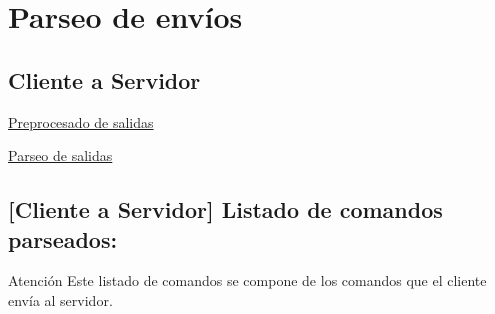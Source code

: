  \section*{Parseo de envíos}

\subsection*{Cliente a Servidor}


\begin{DoxyItemize}
\item \hyperlink{client_pre_out_function}{Preprocesado de salidas} 
\item \hyperlink{client_execute_out_function}{Parseo de salidas} 
\end{DoxyItemize}

\subsection*{\mbox{[}Cliente a Servidor\mbox{]} Listado de comandos parseados\+:}

\begin{DoxyWarning}{Atención}
Este listado de comandos se compone de los comandos que el cliente envía al servidor.
\end{DoxyWarning}

